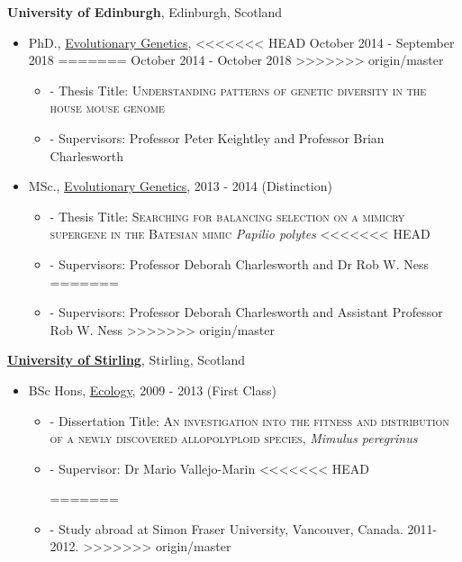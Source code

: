 \documentclass[11pt]{article}
\newenvironment{outerlist}[1][\enskip\textbullet]%
        {\begin{itemize}[#1,leftmargin=*]}{\end{itemize}%
         \vspace{-.6\baselineskip}}
\newenvironment{innerlist}[1][\enskip\textbullet]%
        {\begin{itemize}[#1,leftmargin=*,parsep=0pt,itemsep=0pt,topsep=0pt,partopsep=0pt]}
        {\end{itemize}}
\begin{document}
{\textbf{University of Edinburgh}},
Edinburgh, Scotland
\begin{outerlist}

\item[] PhD.,
             \href{http://www.ed.ac.uk/biology/evolutionary-biology} {Evolutionary Genetics},
<<<<<<< HEAD
             October 2014 - September 2018  
=======
             October 2014 - October 2018  
>>>>>>> origin/master
        \begin{innerlist}
        \item[]- Thesis Title: \textsc{Understanding patterns of genetic diversity in the house mouse genome}
        \item[]- Supervisors: Professor Peter Keightley and Professor Brian Charlesworth

        \end{innerlist}

\item[] MSc.,
        \href{http://qgen.bio.ed.ac.uk/}
             {Evolutionary Genetics},
             2013 - 2014 (Distinction)
        \begin{innerlist}
        \item[]- Thesis Title: \textsc{Searching for balancing selection on a mimicry supergene in the Batesian mimic} \textit{Papilio polytes}
<<<<<<< HEAD
        \item[]- Supervisors: Professor Deborah Charlesworth and Dr Rob W. Ness
=======
        \item[]- Supervisors: Professor Deborah Charlesworth and Assistant Professor Rob W. Ness
>>>>>>> origin/master

        \end{innerlist}
\end{outerlist}
\vspace{.1in}
\href{}{\textbf{University of Stirling}},
Stirling, Scotland
\begin{outerlist}
\item[] BSc Hons,
        \href{http://www.stir.ac.uk/natural-sciences/about-us/bes/}
             {Ecology}, 2009 - 2013 (First Class)
        \begin{innerlist}
        \item[]- Dissertation Title: \textsc{An investigation into the fitness and distribution of a newly discovered allopolyploid species,} \textit{Mimulus peregrinus}
        \item[]- Supervisor:
                   Dr Mario Vallejo-Marin
<<<<<<< HEAD

=======
		\item[]- Study abroad at Simon Fraser University, Vancouver, Canada. 2011-2012.
>>>>>>> origin/master
        \end{innerlist}
\end{outerlist}
\end{document}
